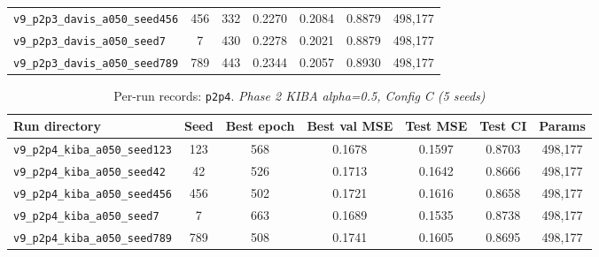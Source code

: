 \begin{table}[!h]
\begin{tabular}{p{4.8cm}cccccc}
\texttt{v9\_\allowbreak{}p2p3\_\allowbreak{}davis\_\allowbreak{}a050\_\allowbreak{}seed456} & 456 & 332 & 0.2270 & 0.2084 & 0.8879 & 498,177 \\
\texttt{v9\_\allowbreak{}p2p3\_\allowbreak{}davis\_\allowbreak{}a050\_\allowbreak{}seed7} & 7 & 430 & 0.2278 & 0.2021 & 0.8879 & 498,177 \\
\texttt{v9\_\allowbreak{}p2p3\_\allowbreak{}davis\_\allowbreak{}a050\_\allowbreak{}seed789} & 789 & 443 & 0.2344 & 0.2057 & 0.8930 & 498,177 \\
\bottomrule
\end{tabular}
\end{table}

\begin{table}[!h]
\centering\scriptsize
\caption{Per-run records: \texttt{p2p4}. \textit{Phase 2 KIBA alpha=0.5, Config C (5 seeds)}}
\label{tab:v9_runs_p2p4}
\begin{tabular}{p{4.8cm}cccccc}
\toprule
Run directory & Seed & Best epoch & Best val MSE & Test MSE & Test CI & Params \\
\midrule
\texttt{v9\_\allowbreak{}p2p4\_\allowbreak{}kiba\_\allowbreak{}a050\_\allowbreak{}seed123} & 123 & 568 & 0.1678 & 0.1597 & 0.8703 & 498,177 \\
\texttt{v9\_\allowbreak{}p2p4\_\allowbreak{}kiba\_\allowbreak{}a050\_\allowbreak{}seed42} & 42 & 526 & 0.1713 & 0.1642 & 0.8666 & 498,177 \\
\texttt{v9\_\allowbreak{}p2p4\_\allowbreak{}kiba\_\allowbreak{}a050\_\allowbreak{}seed456} & 456 & 502 & 0.1721 & 0.1616 & 0.8658 & 498,177 \\
\texttt{v9\_\allowbreak{}p2p4\_\allowbreak{}kiba\_\allowbreak{}a050\_\allowbreak{}seed7} & 7 & 663 & 0.1689 & 0.1535 & 0.8738 & 498,177 \\
\texttt{v9\_\allowbreak{}p2p4\_\allowbreak{}kiba\_\allowbreak{}a050\_\allowbreak{}seed789} & 789 & 508 & 0.1741 & 0.1605 & 0.8695 & 498,177 \\
\bottomrule
\end{tabular}
\end{table}

